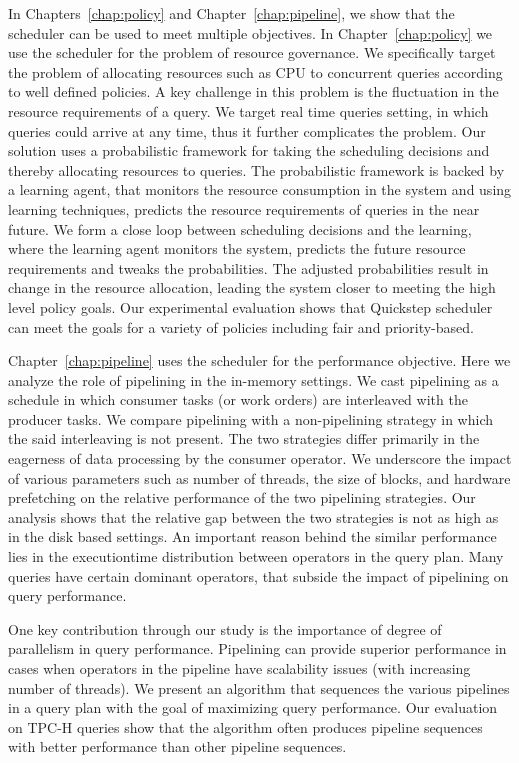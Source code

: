 In Chapters~\ref{chap:policy} and Chapter~\ref{chap:pipeline}, we show that the scheduler can be used to meet multiple objectives.
In Chapter~\ref{chap:policy} we use the scheduler for the problem of resource governance.
We specifically target the problem of allocating resources such as CPU to concurrent queries according to well defined policies.
A key challenge in this problem is the fluctuation in the resource requirements of a query.
We target real time queries setting, in which queries could arrive at any time, thus it further complicates the problem.
Our solution uses a probabilistic framework for taking the scheduling decisions and thereby allocating resources to queries.
The probabilistic framework is backed by a learning agent, that monitors the resource consumption in the system and using learning techniques, predicts the resource requirements of queries in the near future.  
We form a close loop between scheduling decisions and the learning, where the learning agent monitors the system, predicts the future resource requirements and tweaks the probabilities. 
The adjusted probabilities result in change in the resource allocation, leading the system closer to meeting the high level policy goals.
Our experimental evaluation shows that Quickstep scheduler can meet the goals for a variety of policies including fair and priority-based. 

Chapter~\ref{chap:pipeline} uses the scheduler for the performance objective.
Here we analyze the role of pipelining in the in-memory settings. 
We cast pipelining as a schedule in which consumer tasks (or work orders) are interleaved with the producer tasks. 
We compare pipelining with a non-pipelining strategy in which the said interleaving is not present. 
The two strategies differ primarily in the eagerness of data processing by the consumer operator. 
We underscore the impact of various parameters such as number of threads, the size of blocks, and hardware prefetching on the relative performance of the two pipelining strategies. 
Our analysis shows that the relative gap between the two strategies is not as high as in the disk based settings. 
An important reason behind the similar performance lies in the executiontime distribution between operators
in the query plan.
Many queries have certain dominant operators, that subside the impact of pipelining on query performance.

One key contribution through our study is the importance of degree of parallelism in query performance. 
Pipelining can provide superior performance in cases when operators in the pipeline have scalability issues (with increasing number of threads). 
We present an algorithm that sequences the various pipelines in a query plan with the goal of maximizing query performance.  
Our evaluation on TPC-H queries show that the algorithm often produces pipeline sequences with better performance than other pipeline sequences. 

